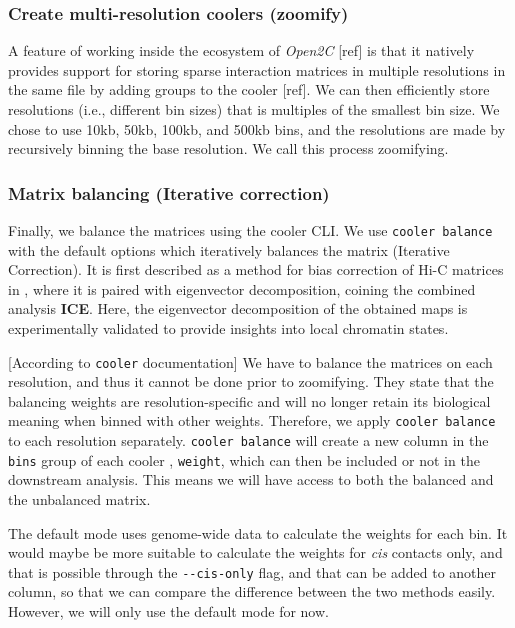 \documentclass[
  11pt,
  a4paper,
]{scrbook}
\let\oldemph\emph
\renewcommand\emph[1]{\oldemph{\color{gray}#1}}
\begin{document}
\subsubsection{Create multi-resolution coolers
(zoomify)}\label{create-multi-resolution-coolers-zoomify}

A feature of working inside the ecosystem of \emph{Open2C} {[}ref{]} is
that it natively provides support for storing sparse interaction
matrices in multiple resolutions in the same file by adding groups to
the cooler {[}ref{]}. We can then efficiently store resolutions (i.e.,
different bin sizes) that is multiples of the smallest bin size. We
chose to use 10kb, 50kb, 100kb, and 500kb bins, and the resolutions are
made by recursively binning the base resolution. We call this process
zoomifying.

\subsubsection{Matrix balancing (Iterative
correction)}\label{matrix-balancing-iterative-correction}

Finally, we balance the matrices using the cooler CLI. We use
\texttt{cooler\ balance} with the default options which iteratively
balances the matrix (Iterative Correction). It is first described as a
method for bias correction of Hi-C matrices in
\citep{imakaev_iterative_2012}, where it is paired with eigenvector
decomposition, coining the combined analysis \textbf{ICE}. Here, the
eigenvector decomposition of the obtained maps is experimentally
validated to provide insights into local chromatin states.

{[}According to \texttt{cooler} documentation{]} We have to balance the
matrices on each resolution, and thus it cannot be done prior to
zoomifying. They state that the balancing weights are
resolution-specific and will no longer retain its biological meaning
when binned with other weights. Therefore, we apply
\texttt{cooler\ balance} to each resolution separately.
\texttt{cooler\ balance} will create a new column in the \texttt{bins}
group of each cooler , \texttt{weight}, which can then be included or
not in the downstream analysis. This means we will have access to both
the balanced and the unbalanced matrix.

The default mode uses genome-wide data to calculate the weights for each
bin. It would maybe be more suitable to calculate the weights for
\emph{cis} contacts only, and that is possible through the
\texttt{-\/-cis-only} flag, and that can be added to another column, so
that we can compare the difference between the two methods easily.
However, we will only use the default mode for now.
\end{document}
